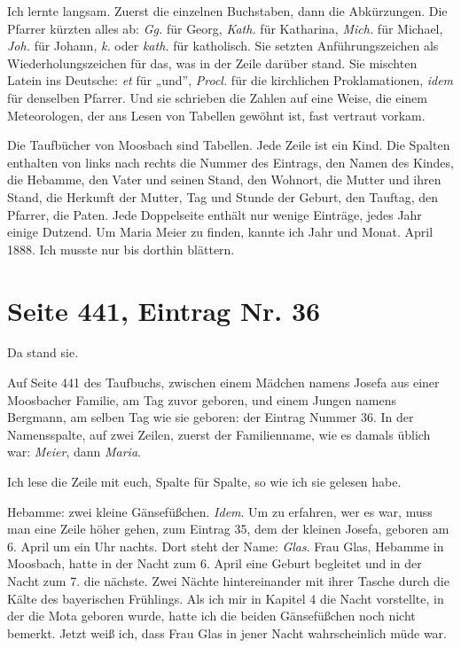 \documentclass[
  ngerman,
  11pt,
  openany]{book}
\begin{document}
Ich lernte langsam. Zuerst die einzelnen Buchstaben, dann die
Abkürzungen. Die Pfarrer kürzten alles ab: \emph{Gg.} für Georg,
\emph{Kath.} für Katharina, \emph{Mich.} für Michael, \emph{Joh.} für
Johann, \emph{k.} oder \emph{kath.} für katholisch. Sie setzten
Anführungszeichen als Wiederholungszeichen für das, was in der Zeile
darüber stand. Sie mischten Latein ins Deutsche: \emph{et} für „und'',
\emph{Procl.} für die kirchlichen Proklamationen, \emph{idem} für
denselben Pfarrer. Und sie schrieben die Zahlen auf eine Weise, die
einem Meteorologen, der ans Lesen von Tabellen gewöhnt ist, fast
vertraut vorkam.

Die Taufbücher von Moosbach sind Tabellen. Jede Zeile ist ein Kind. Die
Spalten enthalten von links nach rechts die Nummer des Eintrags, den
Namen des Kindes, die Hebamme, den Vater und seinen Stand, den Wohnort,
die Mutter und ihren Stand, die Herkunft der Mutter, Tag und Stunde der
Geburt, den Tauftag, den Pfarrer, die Paten. Jede Doppelseite enthält
nur wenige Einträge, jedes Jahr einige Dutzend. Um Maria Meier zu
finden, kannte ich Jahr und Monat. April 1888. Ich musste nur bis
dorthin blättern.

\section{Seite 441, Eintrag Nr. 36}\label{seite-441-eintrag-nr.-36}

Da stand sie.

Auf Seite 441 des Taufbuchs, zwischen einem Mädchen namens Josefa aus
einer Moosbacher Familie, am Tag zuvor geboren, und einem Jungen namens
Bergmann, am selben Tag wie sie geboren: der Eintrag Nummer 36. In der
Namensspalte, auf zwei Zeilen, zuerst der Familienname, wie es damals
üblich war: \emph{Meier}, dann \emph{Maria}.

Ich lese die Zeile mit euch, Spalte für Spalte, so wie ich sie gelesen
habe.

Hebamme: zwei kleine Gänsefüßchen. \emph{Idem}. Um zu erfahren, wer es
war, muss man eine Zeile höher gehen, zum Eintrag 35, dem der kleinen
Josefa, geboren am 6. April um ein Uhr nachts. Dort steht der Name:
\emph{Glas}. Frau Glas, Hebamme in Moosbach, hatte in der Nacht zum 6.
April eine Geburt begleitet und in der Nacht zum 7. die nächste. Zwei
Nächte hintereinander mit ihrer Tasche durch die Kälte des bayerischen
Frühlings. Als ich mir in Kapitel 4 die Nacht vorstellte, in der die
Mota geboren wurde, hatte ich die beiden Gänsefüßchen noch nicht
bemerkt. Jetzt weiß ich, dass Frau Glas in jener Nacht wahrscheinlich
müde war.
\end{document}
